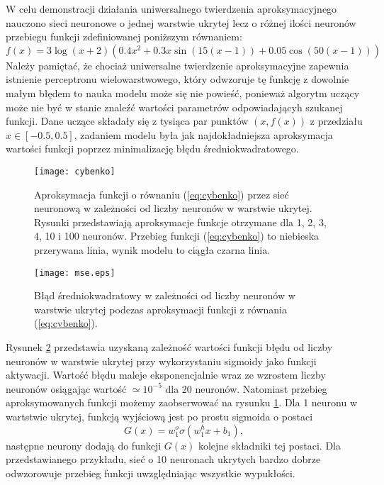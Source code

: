 \documentclass[11pt]{book}
\theoremstyle{definition}
\begin{document}
W celu demonstracji działania uniwersalnego twierdzenia aproksymacyjnego nauczono sieci neuronowe o jednej warstwie ukrytej lecz o różnej ilości neuronów przebiegu funkcji zdefiniowanej poniższym równaniem:
%
\begin{equation}
f(x) = 3\log\left(x+2\right) \left(0.4x^2+0.3x\sin(15(x-1))+0.05\cos\left(50(x-1)\right)\right) \label{eq:cybenko}
\end{equation}
%
Należy pamiętać, że chociaż uniwersalne twierdzenie aproksymacyjne zapewnia istnienie perceptronu wielowarstwowego, który odwzoruje tę funkcję z dowolnie małym błędem to nauka modelu może się nie powieść, ponieważ algorytm uczący może nie być w stanie znaleźć wartości parametrów odpowiadającyh szukanej funkcji. Dane uczące składały się z tysiąca par punktów $(x,f(x))$ z przedziału $x\in [-0.5,0.5]$, zadaniem modelu była jak najdokładniejsza aproksymacja wartości funkcji poprzez minimalizację błędu średniokwadratowego. 
%
\begin{figure}[h!]
	\centering
	\texttt{[image: cybenko]}
	\caption{Aproksymacja funkcji o równaniu (\ref{eq:cybenko}) przez sieć neuronową w zależności od liczby neuronów w warstwie ukrytej. Rysunki przedstawiają aproksymacje funkcje otrzymane dla 1, 2, 3, 4, 10 i 100 neuronów. Przebieg funkcji (\ref{eq:cybenko}) to niebieska przerywana linia, wynik modelu to ciągła czarna linia.}
	\label{fig:cybenko2}
\end{figure}
%
\begin{figure}[h!]
	\centering
	\texttt{[image: mse.eps]}
	\caption{Błąd średniokwadratowy w zależności od liczby neuronów w warstwie ukrytej podczas aproksymacji funkcji z równania (\ref{eq:cybenko}).}
	\label{fig:cybenko1}
\end{figure}
Rysunek \ref{fig:cybenko1} przedstawia uzyskaną zależność wartości funkcji błędu od liczby neuronów w warstwie ukrytej przy wykorzystaniu sigmoidy jako funkcji aktywacji. Wartość błędu maleje eksponencjalnie wraz ze wzrostem liczby neuronów osiągając wartość $\simeq 10^{-5}$ dla 20 neuronów.
%
Natomiast przebieg aproksymowanych funkcji możemy zaobserwować na rysunku \ref{fig:cybenko2}. Dla 1 neuronu w wartstwie ukrytej, funkcją wyjściową jest po prostu sigmoida o postaci $$G\left(x\right) = w^o_1 \sigma\left(w^h_1x + b_1\right),$$ następne neurony dodają do funkcji $G(x)$ kolejne składniki tej postaci. Dla przedstawianego przykładu, sieć o 10 neuronach ukrytych bardzo dobrze odwzorowuje przebieg funkcji uwzględniając wszystkie wypukłości.
\end{document}
